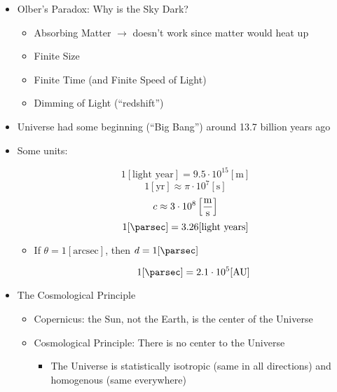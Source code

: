 \begin{itemize}

  \item Olber's Paradox: Why is the Sky Dark?

    \begin{itemize}

      \item Absorbing Matter $\to$ doesn't work since matter would heat up

      \item Finite Size

      \item Finite Time (and Finite Speed of Light)

      \item Dimming of Light (``redshift'')

    \end{itemize}

  \item Universe had some beginning (``Big Bang'') around 13.7 billion years ago

  \item Some units:

    $$1[\text{light year}]=9.5\cdot10^{15}[\si{\meter}]$$
    $$1[\text{yr}]\approx \pi\cdot10^{7}[\si{\second}]$$
    $$c\approx 3\cdot10^8\left[ \si{\meter\over\second} \right]$$
    $$1[\si{\parsec}]=3.26[\text{light years}]$$

    \begin{itemize}

      \item If $\theta=1[\text{arcsec}]$, then $d=1[\si{\parsec}]$

        $$1[\si{\parsec}]=2.1\cdot10^5[\text{AU}]$$

    \end{itemize}

  \item The Cosmological Principle

    \begin{itemize}

      \item Copernicus: the Sun, not the Earth, is the center of the Universe

      \item Cosmological Principle: There is no center to the Universe

        \begin{itemize}

          \item The Universe is statistically isotropic (same in all directions) and homogenous (same everywhere)


\end{itemize}
\end{itemize}
\end{itemize}
